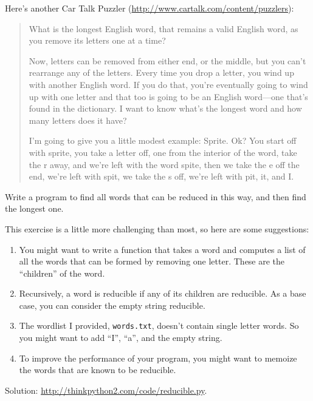 \documentclass[10pt]{book}
\begin{document}
\begin{exercise}

Here's another Car Talk Puzzler
(\url{http://www.cartalk.com/content/puzzlers}):

\begin{quote}
What is the longest English word, that remains a valid English word,
as you remove its letters one at a time?

Now, letters can be removed from either end, or the middle, but you
can't rearrange any of the letters. Every time you drop a letter, you
wind up with another English word. If you do that, you're eventually
going to wind up with one letter and that too is going to be an
English word---one that's found in the dictionary. I want to know
what's the longest word and how many letters does it
have?

I'm going to give you a little modest example: Sprite. Ok? You start
off with sprite, you take a letter off, one from the interior of the
word, take the r away, and we're left with the word spite, then we
take the e off the end, we're left with spit, we take the s off, we're
left with pit, it, and I.
\end{quote}

Write a program to find all words that can be reduced in this way,
and then find the longest one.

This exercise is a little more challenging than most, so here are
some suggestions:

\begin{enumerate}

\item You might want to write a function that takes a word and
  computes a list of all the words that can be formed by removing one
  letter.  These are the ``children'' of the word.

\item Recursively, a word is reducible if any of its children
are reducible.  As a base case, you can consider the empty
string reducible.

\item The wordlist I provided, {\tt words.txt}, doesn't
contain single letter words.  So you might want to add
``I'', ``a'', and the empty string.

\item To improve the performance of your program, you might want
to memoize the words that are known to be reducible.

\end{enumerate}

Solution: \url{http://thinkpython2.com/code/reducible.py}.

\end{exercise}
\end{document}
